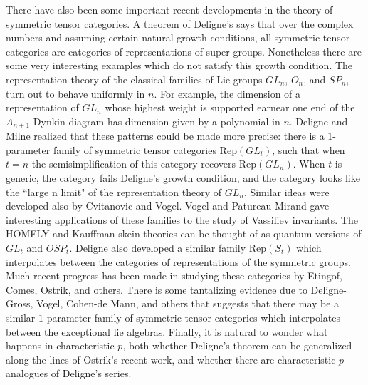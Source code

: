\documentclass[12pt]{article}
\begin{document}
There have also been some important recent developments in the theory of symmetric tensor categories. A theorem of Deligne's says that over the complex numbers and assuming certain natural growth conditions, all symmetric tensor categories are categories of representations of super groups. Nonetheless there are some very interesting examples which do not satisfy this growth condition. The representation theory of the classical families of Lie groups $GL_n$, $O_n$, and $SP_n$, turn out to behave uniformly in $n$. For example, the dimension of a representation of $GL_n$ whose highest weight is supported earnear one end of the $A_{n+1}$ Dynkin diagram has dimension given by a polynomial in $n$. Deligne and Milne realized that these patterns could be made more precise: there is a $1$-parameter family of symmetric tensor categories $\mathrm{Rep}(GL_t)$, such that when $t=n$ the semisimplification of this category recovers $\mathrm{Rep}(GL_n)$. When $t$ is generic, the category fails Deligne's growth condition, and the category looks like the ``large n limit" of the representation theory of $GL_n$.  Similar ideas were developed also by Cvitanovic and Vogel. Vogel and Patureau-Mirand gave interesting applications of these families to the study of Vassiliev invariants.  The HOMFLY and Kauffman skein theories can be thought of as quantum versions of $GL_t$ and $OSP_t$.  Deligne also developed a similar family $\mathrm{Rep}(S_t)$ which interpolates between the categories of representations of the symmetric groups. Much recent progress has been made in studying these categories by Etingof, Comes, Ostrik, and others. There is some tantalizing evidence due to Deligne-Gross, Vogel, Cohen-de Mann, and others that suggests that there may be a similar $1$-parameter family of symmetric tensor categories which interpolates between the exceptional lie algebras. Finally, it is natural to wonder what happens in characteristic $p$, both whether Deligne's theorem can be generalized along the lines of Ostrik's recent work, and whether there are characteristic $p$ analogues of Deligne's series.
\end{document}
